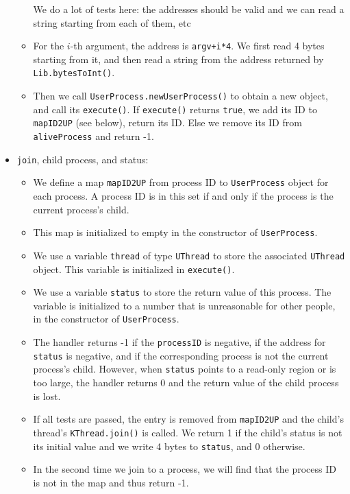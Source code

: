 \documentclass{article}
\begin{document}
\begin{itemize}
\begin{itemize}
	We do a lot of tests here: the addresses should be valid and we can read a string starting from each of them, etc
	\item
	For the $i$-th argument, the address is \texttt{argv+i*4}.
	We first read 4 bytes starting from it, and then read a string from the address returned by \texttt{Lib.bytesToInt()}.
	\item
	Then we call \texttt{UserProcess.newUserProcess()} to obtain a new object, and call its \texttt{execute()}.
	If \texttt{execute()} returns \texttt{true}, we add its ID to \texttt{mapID2UP} (see below), return its ID.
	Else we remove its ID from \texttt{aliveProcess} and return -1.
	\end{itemize}
\item
\texttt{join}, child process, and status:
	\begin{itemize}
	\item
	We define a map \texttt{mapID2UP} from process ID to \texttt{UserProcess} object for each process.
	A process ID is in this set if and only if the process is the current process's child.
	\item
	This map is initialized to empty in the constructor of \texttt{UserProcess}.
	\item
	We use a variable \texttt{thread} of type \texttt{UThread} to store the associated \texttt{UThread} object.
	This variable is initialized in \texttt{execute()}.
	\item
	We use a variable \texttt{status} to store the return value of this process.
	The variable is initialized to a number that is unreasonable for other people, in the constructor of \texttt{UserProcess}.
	\item
	The handler returns -1 if the \texttt{processID} is negative, if the address for \texttt{status} is negative, and if the corresponding process is not the current process's child.
	However, when \texttt{status} points to a read-only region or is too large, the handler returns 0 and the return value of the child process is lost.
	\item
	If all tests are passed, the entry is removed from \texttt{mapID2UP} and the child's thread's \texttt{KThread.join()} is called.
	We return 1 if the child's status is not its initial value and we write 4 bytes to \texttt{status}, and 0 otherwise.
	\item
	In the second time we join to a process, we will find that the process ID is not in the map and thus return -1.
	\end{itemize}
\end{itemize}
\end{document}
